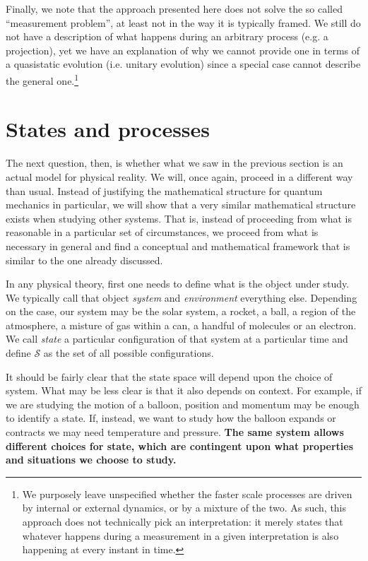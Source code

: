 \documentclass[11pt]{article}
\begin{document}
Finally, we note that the approach presented here does not solve the so called ``measurement problem''\cite{Genovese,Bassi}, at least not in the way it is typically framed. We still do not have a description of what happens during an arbitrary process (e.g. a projection), yet we have an explanation of why we cannot provide one in terms of a quasistatic evolution (i.e. unitary evolution) since a special case cannot describe the general one.\footnote{We purposely leave unspecified whether the faster scale processes are driven by internal or external dynamics, or by a mixture of the two. As such, this approach does not technically pick an interpretation: it merely states that whatever happens during a measurement in a given interpretation is also happening at every instant in time.}

\section{States and processes}

The next question, then, is whether what we saw in the previous section is an actual model for physical reality. We will, once again, proceed in a different way than usual. Instead of justifying the mathematical structure for quantum mechanics in particular, we will show that a very similar mathematical structure exists when studying other systems. That is, instead of proceeding from what is reasonable in a particular set of circumstances, we proceed from what is necessary in general and find a conceptual and mathematical framework that is similar to the one already discussed.

In any physical theory, first one needs to define what is the object under study. We typically call that object \emph{system} and \emph{environment} everything else. Depending on the case, our system may be the solar system, a rocket, a ball, a region of the atmosphere, a misture of gas within a can, a handful of molecules or an electron. We call \emph{state} a particular configuration of that system at a particular time and define $\mathcal{S}$ as the set of all possible configurations.

It should be fairly clear that the state space will depend upon the choice of system. What may be less clear is that it also depends on context. For example, if we are studying the motion of a balloon, position and momentum may be enough to identify a state. If, instead, we want to study how the balloon expands or contracts we may need temperature and pressure. \textbf{The same system allows different choices for state, which are contingent upon what properties and situations we choose to study.} 
\end{document}

